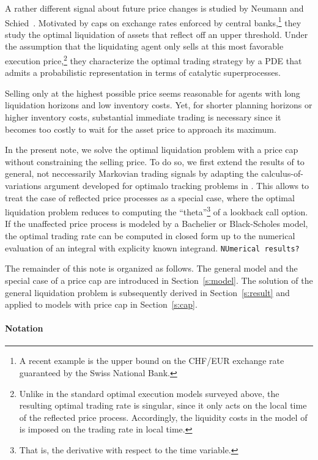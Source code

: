 \documentclass[11pt]{article}
\theoremstyle{definition}
\theoremstyle{remark}
\begin{document}
A rather different signal about future price changes is studied by Neumann and Schied~\cite{neumann.schied.??}. Motivated by caps on exchange rates enforced by central banks,\footnote{A recent example is the upper bound on the CHF/EUR exchange rate guaranteed by the Swiss National Bank.} they study the optimal liquidation of assets that reflect off an upper threshold.  Under the assumption that the liquidating agent only sells at this most favorable execution price,\footnote{Unlike in the standard optimal execution models surveyed above, the resulting optimal trading rate is singular, since it only acts on the local time of the reflected price process. Accordingly, the liquidity costs in the model of \cite{neumann.schied.??} is imposed on the trading rate in local time.} they characterize the optimal trading strategy by a PDE that admits a probabilistic representation in terms of catalytic superprocesses. 

Selling only at the highest possible price seems reasonable for agents with long liquidation horizons and low inventory costs. Yet, for shorter planning horizons or higher inventory costs, substantial immediate trading is necessary since it becomes too costly to wait for the asset price to approach its maximum.

In the present note, we solve the optimal liquidation problem with a price cap without constraining the selling price. To do so, we first extend the results of \cite{lehalle2017incorporating} to general, not neccessarily Markovian trading signals by adapting the calculus-of-variations argument developed for optimalo tracking problems in \cite{bank.al.17,bouchard2017equilibrium}. This allows to treat the case of reflected price processes as a special case, where the optimal liquidation problem reduces to computing the ``theta''\footnote{That is, the derivative with respect to the time variable.} of a lookback call option. If the unaffected price process is modeled by a Bachelier or Black-Scholes model, the optimal trading rate can be computed in closed form up to the numerical evaluation of an integral with explicity known integrand. \texttt{NUmerical results?}

The remainder of this note is organized as follows. The general model and the special case of a price cap are introduced in Section~\ref{s:model}. The solution of the general liquidation problem is subsequently derived in Section~\ref{s:result} and applied to models with price cap in Section~\ref{s:cap}.

\paragraph{Notation}
\end{document}
